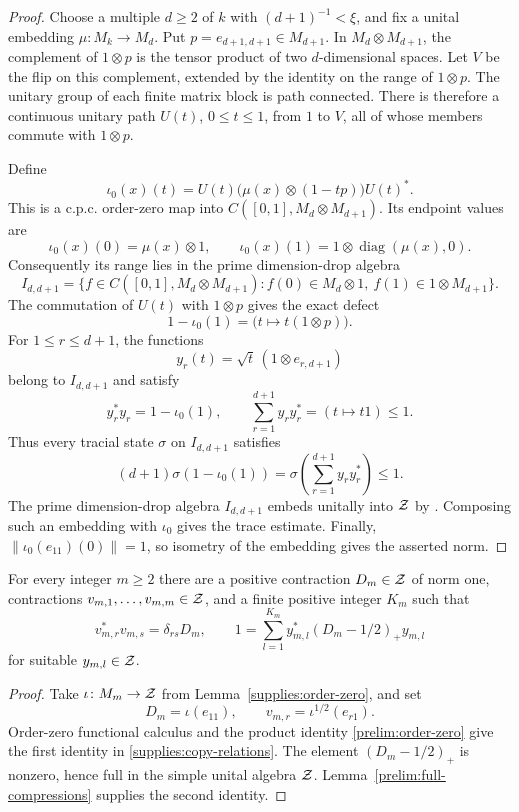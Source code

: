 \begin{proof}
Choose a multiple $d\geq2$ of $k$ with $(d+1)^{-1}<\xi$, and fix a
unital embedding $\mu\colon M_k\to M_d$.  Put
$p=e_{d+1,d+1}\in M_{d+1}$.  In $M_d\otimes M_{d+1}$, the complement
of $1\otimes p$ is the tensor product of two $d$-dimensional spaces.
Let $V$ be the flip on this complement, extended by the identity on
the range of $1\otimes p$.  The unitary group of each finite matrix
block is path connected.  There is therefore a continuous unitary path
$U(t)$, $0\leq t\leq1$, from $1$ to $V$, all of whose members commute
with $1\otimes p$.

Define
\[
 \iota_0(x)(t)
   =U(t)\bigl(\mu(x)\otimes(1-tp)\bigr)U(t)^*.
\]
This is a c.p.c. order-zero map into $C([0,1],M_d\otimes M_{d+1})$.
Its endpoint values are
\[
 \iota_0(x)(0)=\mu(x)\otimes1,
 \qquad
 \iota_0(x)(1)=1\otimes\operatorname{diag}(\mu(x),0).
\]
Consequently its range lies in the prime dimension-drop algebra
\[
 I_{d,d+1}
 =\{f\in C([0,1],M_d\otimes M_{d+1}):
 f(0)\in M_d\otimes1,\ f(1)\in1\otimes M_{d+1}\}.
\]
The commutation of $U(t)$ with $1\otimes p$ gives the exact defect
\[
 1-\iota_0(1)=\bigl(t\mapsto t(1\otimes p)\bigr).
\]
For $1\leq r\leq d+1$, the functions
\[
 y_r(t)=\sqrt t\,(1\otimes e_{r,d+1})
\]
belong to $I_{d,d+1}$ and satisfy
\[
 y_r^*y_r=1-\iota_0(1),
 \qquad
 \sum_{r=1}^{d+1}y_ry_r^*=(t\mapsto t1)\leq1.
\]
Thus every tracial state $\sigma$ on $I_{d,d+1}$ satisfies
\[
 (d+1)\sigma(1-\iota_0(1))
   =\sigma\left(\sum_{r=1}^{d+1}y_ry_r^*\right)\leq1.
\]
The prime dimension-drop algebra $I_{d,d+1}$ embeds
unitally into $\mathcal Z$ by \cite[Theorem~2.1(i)]{Rordam}.
Composing such an embedding with
$\iota_0$ gives the trace estimate.  Finally,
$\|\iota_0(e_{11})(0)\|=1$, so isometry of the embedding gives the
asserted norm.
\end{proof}

\begin{lemma}\label{supplies:copies}
For every integer $m\geq2$ there are a positive contraction
$D_m\in\mathcal Z$ of norm one, contractions $v_{m,1},\ldots,v_{m,m}\in\mathcal Z$,
and a finite positive integer $K_m$ such that
\begin{equation}\label{supplies:copy-relations}
 v_{m,r}^*v_{m,s}=\delta_{rs}D_m,
 \qquad
 1=\sum_{l=1}^{K_m}y_{m,l}^*(D_m-1/2)_+y_{m,l}
\end{equation}
for suitable $y_{m,l}\in\mathcal Z$.
\end{lemma}

\begin{proof}
Take $\iota\colon M_m\to\mathcal Z$ from
Lemma~\ref{supplies:order-zero}, and set
\[
 D_m=\iota(e_{11}),\qquad v_{m,r}=\iota^{1/2}(e_{r1}).
\]
Order-zero functional calculus and the product identity
\eqref{prelim:order-zero} give the first identity in
\eqref{supplies:copy-relations}.  The element $(D_m-1/2)_+$ is
nonzero, hence full in the simple unital algebra $\mathcal Z$.
Lemma~\ref{prelim:full-compressions} supplies the second identity.
\end{proof}

